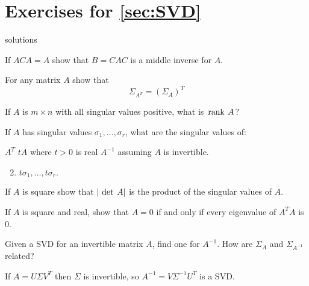 \section*{Exercises for \ref{sec:SVD}}

\begin{Filesave}{solutions}
\end{Filesave}

\begin{multicols}{2}
\begin{ex}
If $ACA=A$ show that $B=CAC$ is a middle inverse for $A$.
\end{ex} 

\begin{ex} 
For any matrix $A$ show that
\begin{equation*}
\Sigma_{A^{T}}=(\Sigma_{A})^{T}
\end{equation*}
\end{ex}

\begin{ex}
If $A$ is $m\times n$ with all singular values positive, what is $\thinspace\operatorname{rank\medspace}A$?
\end{ex}

\begin{ex}
If $A$ has singular values $\sigma_{1},\dots ,\sigma_{r}$, what are the singular values of:

\begin{exenumerate}
\exitem $A^{T}$ 
\exitem $tA$ where $t>0$ is real
\exitem* $A^{-1}$ assuming $A$ is invertible.
\end{exenumerate}

\begin{sol}
\begin{enumerate}[label={\alph*.}]
\setcounter{enumi}{1}
\item $t\sigma _{1},\dots ,t\sigma _{r}.$
\end{enumerate}
\end{sol}
\end{ex}

\begin{ex}
If $A$ is square show that $| \thinspace\operatorname{det\medspace}A |$ is the product of the singular values of $A$.
\end{ex}

\begin{ex}
If $A$ is square and real, show that $A=0$ if and only if every eigenvalue of $A^T A$ is $0$.
\end{ex} 

\begin{ex}
Given a SVD for an invertible matrix $A$, find one for $A^{-1}$. How are $\Sigma_{A}$ and $\Sigma_{A^{-1}}$ related?
\begin{sol}
If $A=U\Sigma V^{T}$ then $\Sigma$ is invertible, so $A^{-1}=V\Sigma^{-1}U^{T}$ is a SVD.
\end{sol}
\end{ex}


\end{multicols}
